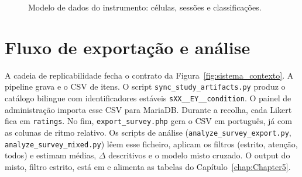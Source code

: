 \begin{figure}[ht]
\centering
{}
\caption{Modelo de dados do instrumento: células, sessões e classificações.}
\label{fig:erd}
\end{figure}


\section{Fluxo de exportação e análise}
\label{sec:impl_export}

A cadeia de replicabilidade fecha o contrato da Figura~\ref{fig:sistema_contexto}. A pipeline grava  e o CSV de itens. O script \texttt{sync\_study\_artifacts.py} produz o catálogo bilingue com identificadores estáveis \texttt{sXX\_\_EY\_\_condition}. O painel de administração importa esse CSV para MariaDB. Durante a recolha, cada Likert fica em \texttt{ratings}. No fim, \texttt{export\_survey.php} gera o CSV em português, já com as colunas de ritmo relativo. Os scripts de análise (\texttt{analyze\_survey\_export.py}, \texttt{analyze\_survey\_mixed.py}) lêem esse ficheiro, aplicam os filtros (estrito, atenção, todos) e estimam médias, \(\Delta\) descritivos e o modelo misto cruzado. O output do misto, filtro estrito, está em  e alimenta as tabelas do Capítulo~\ref{chap:Chapter5}.

